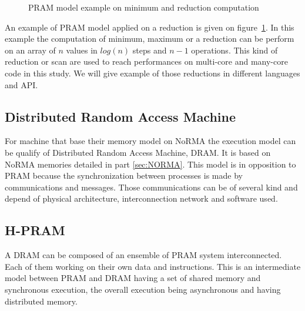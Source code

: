 \begin{figure}[t!]
{
}
\caption{PRAM model example on minimum and reduction computation}
\label{fig:pram_reduction}
\end{figure}

An example of PRAM model applied on a reduction is given on figure~\ref{fig:pram_reduction}.
In this example the computation of minimum, maximum or a reduction can be perform on an array of $n$ values in $log(n)$ steps and $n-1$ operations.
This kind of reduction or scan are used to reach performances on multi-core and many-core code in this study.
We will give example of those reductions in different languages and API. 

\subsection{Distributed Random Access Machine}
For machine that base their memory model on NoRMA the execution model can be qualify of Distributed Random Access Machine, DRAM.
It is based on NoRMA memories detailed in part \ref{sec:NORMA}.
This model is in opposition to PRAM because the synchronization between processes is made by communications and messages. 
Those communications can be of several kind and depend of physical architecture, interconnection network and software used.

\subsection{H-PRAM}
A DRAM can be composed of an ensemble of PRAM system interconnected. 
Each of them working on their own data and instructions. 
This is an intermediate model between PRAM and DRAM having a set of shared memory and synchronous execution, the overall execution being asynchronous and having distributed memory.


